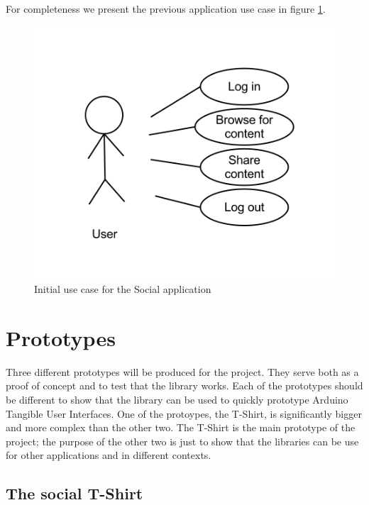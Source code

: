 For completeness we present the previous application use case in figure \ref{fig:design-socialappusecase1}.

\begin{figure}[h!]
\centering \includegraphics[scale=0.35]{img/design-socialappusecase1}
\caption{Initial use case for the Social application}
\label{fig:design-socialappusecase1}
\end{figure}



\section{Prototypes}
\label{sec:prototypes}
Three different prototypes will be produced for the project. They serve both as a proof of concept and
to test that the library works. Each of the prototypes should be different to show that the library can be
used to quickly prototype Arduino Tangible User Interfaces. One of the protoypes, the T-Shirt, is significantly
bigger and more complex than the other two. The T-Shirt is the main prototype of the project; the purpose of the other two
is just to show that the libraries can be use for other applications and in different contexts.

\subsection{The social T-Shirt}
	
